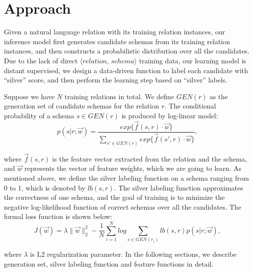 \section{Approach}
\label{sec:approach}

Given a natural language relation with its training relation
instances, our inference model first generates candidate 
schemas from its training relation instances, and then constructs a
probabilistic distribution over all the candidates.
Due to the lack of direct $\langle relation,\, schema \rangle$
training data, our learning model is distant supervised, we design
a data-driven function to label each candidate with ``silver'' 
score, and then perform the learning step based on ``silver'' labels.

Suppose we have $N$ training relations in total.
We define $GEN(r)$ as the generation set of candidate schemas for 
the relation $r$.
The conditional probability of a schema $s \in GEN(r)$ is produced 
by log-linear model:
\begin{equation}
  p(s|r; \vec{w}) = 
    \frac { 
      exp \{ \vec{f} (s, r) \cdot \vec{w} \} 
    } { 
	  \sum\limits_{s' \in GEN(r)} { 
	    exp \{ \vec{f} (s', r) \cdot \vec{w} \} 
	  }
    },
\end{equation}

\noindent
where $\vec{f} (s, r)$ is the feature vector extracted from the
relation and the schema, and $\vec{w}$ represents the vector of
feature weights, which we are going to learn.
As mentioned above, we define the silver labeling function on a 
schema ranging from 0 to 1, which is denoted by $lb(s, r)$.
The silver labeling function approximates the correctness of one
schema, and the goal of training is to minimize the negative 
log-likelihood function of correct schemas over all the candidates.
The formal loss function is shown below:
\begin{equation}
J(\vec{w}) = \lambda \| \vec{w} \|_2^2 \! - \!  
  \frac {1} {N} \! 
  \sum\limits_{i=1}^{N} {
    log \! \sum\limits_{s \in GEN(r_i)} { 
	  lb(s, r) p(s|r; \vec{w}) 
	}
  },
\end{equation}

\noindent
where $\lambda$ is L2 regularization parameter.
In the following sections, we describe generation set, silver 
labeling function and feature functions in detail.





